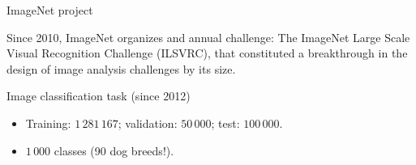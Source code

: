 \documentclass[xcolor=pdftex,dvipsnames,table,mathserif]{beamer}
\begin{document}
\begin{frame}{ImageNet project \tiny{\cite{russakovsky_imagenet_2015}}}

  Since 2010, ImageNet organizes and annual challenge: The ImageNet Large Scale Visual Recognition Challenge (ILSVRC), that constituted a breakthrough in the design of image analysis challenges by its size.

  \begin{block}{Image classification task (since 2012)}
    \begin{itemize}
    \item
      Training: $1\,281\,167$; validation: $50\,000$; test: $100\,000$.
    \item
      $1\,000$ classes (90 dog breeds!).
    \end{itemize}
  \end{block}

\end{frame}
\end{document}
